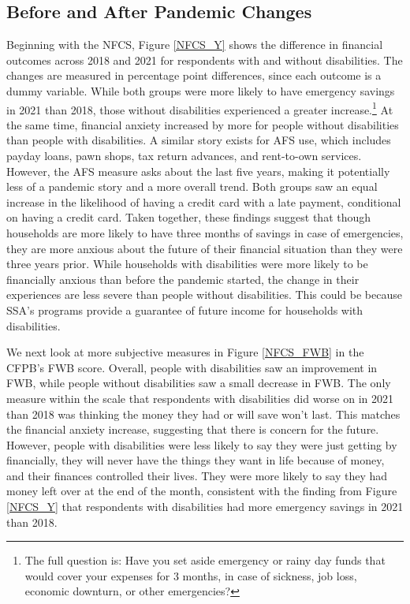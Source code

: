 \documentclass[12pt]{article}
\begin{document}
\subsection{Before and After Pandemic Changes}
Beginning with the NFCS, Figure \ref{NFCS_Y} shows the difference in financial outcomes across 2018 and 2021 for respondents with and without disabilities. The changes are measured in percentage point differences, since each outcome is a dummy variable. While both groups were more likely to have emergency savings in 2021 than 2018, those without disabilities experienced a greater increase.\footnote{The full question is: Have you set aside emergency or rainy day funds that would cover your expenses for 3 months, in case of sickness, job loss, economic downturn, or other emergencies?} At the same time, financial anxiety increased by more for people without disabilities than people with disabilities. A similar story exists for AFS use, which includes payday loans, pawn shops, tax return advances, and rent-to-own services. However, the AFS measure asks about the last five years, making it potentially less of a pandemic story and a more overall trend. Both groups saw an equal increase in the likelihood of having a credit card with a late payment, conditional on having a credit card. Taken together, these findings suggest that though households are more likely to have three months of savings in case of emergencies, they are more  anxious about the future of their financial situation than they were three years prior. While households with disabilities were more likely to be financially anxious than before the pandemic started, the change in their experiences are less severe than people without disabilities. This could be because SSA's programs provide a guarantee of future income for households with disabilities. 

We next look at more subjective measures in Figure \ref{NFCS_FWB} in the CFPB's FWB score. Overall, people with disabilities saw an improvement in FWB, while people without disabilities saw a small decrease in FWB. The only measure within the scale that respondents with disabilities did worse on in 2021 than 2018 was thinking the money they had or will save won't last. This matches the financial anxiety increase, suggesting that there is concern for the future. However, people with disabilities were less likely to say they were just getting by financially, they will never have the things they want in life because of money, and their finances controlled their lives. They were more likely to say they had money left over at the end of the month, consistent with the finding from Figure \ref{NFCS_Y} that respondents with disabilities had more emergency savings in 2021 than 2018. 
\end{document}
